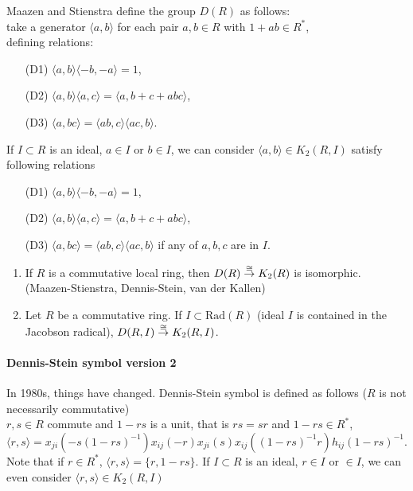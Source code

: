 Maazen and Stienstra define the group $D(R)$ as follows:\\
take a generator $\langle a,b \rangle$ for each pair $a,b\in R$ with $1+ab\in R^*$,\\
defining relations:
\begin{itemize}
	\item[(D1)] $\langle a,b\rangle \langle -b,-a \rangle=1$,\\
	\item[(D2)] $\langle a,b\rangle \langle a,c \rangle=\langle a,b+c+abc \rangle$, \\
	\item[(D3)] $\langle a,bc\rangle =\langle ab,c\rangle \langle ac,b\rangle$.
\end{itemize}
If $I\subset R$ is an ideal, $a\in I$ or $b\in I$, we can consider $\langle a,b\rangle \in K_2(R,I)$ satisfy following relations
\begin{itemize}
	\item[(D1)] $\langle a,b\rangle \langle -b,-a \rangle=1$,\\
	\item[(D2)] $\langle a,b\rangle \langle a,c \rangle=\langle a,b+c+abc \rangle$, \\
	\item[(D3)] $\langle a,bc\rangle =\langle ab,c\rangle \langle ac,b\rangle$ if any of $a,b,c$ are in $I$.
\end{itemize}
\begin{theorem}
	\begin{enumerate}
		\item If $R$ is a {\color{green} commutative local ring}, then $D(R)\overset{\cong}{\to} K_2(R)$ is isomorphic. (Maazen-Stienstra, Dennis-Stein, van der Kallen)\\
		\item Let $R$ be a commutative ring. If $I \subset \mathrm{Rad}(R)$ (ideal $I$ is contained in the Jacobson radical), $D(R,I)\overset{\cong}{\to} K_2(R,I)$.
	\end{enumerate}
	
\end{theorem}


\paragraph{Dennis-Stein symbol {\color{green}version 2}} %
\label{par:dennis_stein_symbol_greenversion_2_}
In 1980s, things have changed. Dennis-Stein symbol is defined as follows ($R$ is not necessarily commutative)\\
$r,s\in R$ commute and $1-rs$ is a unit, that is $rs=sr$ and $1-rs\in R^*$,
\[\langle r,s \rangle = x_{ji}(-s(1-rs)^{-1})x_{ij}(-r)x_{ji}(s)x_{ij}((1-rs)^{-1}r)h_{ij}(1-rs)^{-1}.\]
Note that if $r\in R^*$, $\langle r,s \rangle =\{r,1-rs\}$. If $I\subset R$ is an ideal, $r\in I$ or $\in I$, we can even consider $\langle r,s\rangle \in K_2(R,I)$

